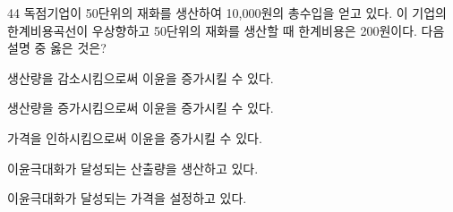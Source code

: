 \begin{question}{44}
독점기업이 50단위의 재화를 생산하여 10,000원의 총수입을 얻고 있다. 이 기업의 한계비용곡선이 우상향하고 50단위의 재화를 생산할 때 한계비용은 200원이다. 다음 설명 중 옳은 것은?
\begin{choices}
  \item 생산량을 감소시킴으로써 이윤을 증가시킬 수 있다.
  \item 생산량을 증가시킴으로써 이윤을 증가시킬 수 있다.
  \item 가격을 인하시킴으로써 이윤을 증가시킬 수 있다.
  \item 이윤극대화가 달성되는 산출량을 생산하고 있다.
  \item 이윤극대화가 달성되는 가격을 설정하고 있다.
\end{choices}
\end{question}

